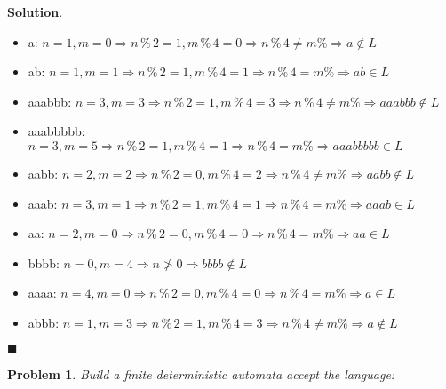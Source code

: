 \documentclass[12pt]{article}
\renewcommand{\=}[1]{\stackrel{#1}{=}} %
\newtheorem{p}{Problem}[section]
\theoremstyle{definition}
\newenvironment{s}{%
        \begin{trivlist} \item \textbf{Solution}. }{%
            \hspace*{\fill} $\blacksquare$\end{trivlist}}%
\begin{document}
  \begin{s} \newline
    \begin{itemize}
      \item a:        \emph{$n = 1, m = 0 \Longrightarrow n \mathbin{\%} 2 = 1, m \mathbin{\%} 4 = 0 \Longrightarrow n \mathbin{\%} 4 \ne m \mathbin{\%} \Longrightarrow a \notin L$}
      \item ab:       \emph{$n = 1, m = 1 \Longrightarrow n \mathbin{\%} 2 = 1, m \mathbin{\%} 4 = 1 \Longrightarrow n \mathbin{\%} 4 = m \mathbin{\%} \Longrightarrow ab \in L$}
      \item aaabbb:   \emph{$n = 3, m = 3 \Longrightarrow n \mathbin{\%} 2 = 1, m \mathbin{\%} 4 = 3 \Longrightarrow n \mathbin{\%} 4 \ne m \mathbin{\%} \Longrightarrow aaabbb \notin L$}
      \item aaabbbbb: \emph{$n = 3, m = 5 \Longrightarrow n \mathbin{\%} 2 = 1, m \mathbin{\%} 4 = 1 \Longrightarrow n \mathbin{\%} 4 = m \mathbin{\%} \Longrightarrow aaabbbbb \in L$}
      \item aabb:     \emph{$n = 2, m = 2 \Longrightarrow n \mathbin{\%} 2 = 0, m \mathbin{\%} 4 = 2 \Longrightarrow n \mathbin{\%} 4 \ne m \mathbin{\%} \Longrightarrow aabb \notin L$}
      \item aaab:     \emph{$n = 3, m = 1 \Longrightarrow n \mathbin{\%} 2 = 1, m \mathbin{\%} 4 = 1 \Longrightarrow n \mathbin{\%} 4 = m \mathbin{\%} \Longrightarrow aaab \in L$}
      \item aa:       \emph{$n = 2, m = 0 \Longrightarrow n \mathbin{\%} 2 = 0, m \mathbin{\%} 4 = 0 \Longrightarrow n \mathbin{\%} 4 = m \mathbin{\%} \Longrightarrow aa \in L$}
      \item bbbb:     \emph{$n = 0, m = 4 \Longrightarrow n \ngtr 0 \Longrightarrow bbbb \notin L$}
      \item aaaa:     \emph{$n = 4, m = 0 \Longrightarrow n \mathbin{\%} 2 = 0, m \mathbin{\%} 4 = 0 \Longrightarrow n \mathbin{\%} 4 = m \mathbin{\%} \Longrightarrow a \in L$}
      \item abbb:     \emph{$n = 1, m = 3 \Longrightarrow n \mathbin{\%} 2 = 1, m \mathbin{\%} 4 = 3 \Longrightarrow n \mathbin{\%} 4 \ne m \mathbin{\%} \Longrightarrow a \notin L$}
    \end{itemize}
  \end{s}
\begin{p}
  Build a finite deterministic automata accept the language: 
\end{p}
\end{document}
